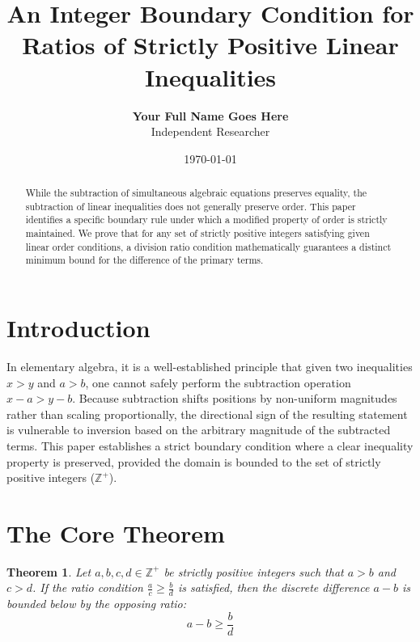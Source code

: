 \documentclass[11pt]{article}
\title{An Integer Boundary Condition for Ratios of Strictly Positive Linear Inequalities}
\author{\textbf{Your Full Name Goes Here} \\ Independent Researcher}
\date{\today}
\newtheorem{theorem}{Theorem}
\begin{document}
\maketitle

\begin{abstract}
While the subtraction of simultaneous algebraic equations preserves equality, the subtraction of linear inequalities does not generally preserve order. This paper identifies a specific boundary rule under which a modified property of order is strictly maintained. We prove that for any set of strictly positive integers satisfying given linear order conditions, a division ratio condition mathematically guarantees a distinct minimum bound for the difference of the primary terms.
\end{abstract}

\section{Introduction}
In elementary algebra, it is a well-established principle that given two inequalities $x > y$ and $a > b$, one cannot safely perform the subtraction operation $x - a > y - b$. Because subtraction shifts positions by non-uniform magnitudes rather than scaling proportionally, the directional sign of the resulting statement is vulnerable to inversion based on the arbitrary magnitude of the subtracted terms. This paper establishes a strict boundary condition where a clear inequality property is preserved, provided the domain is bounded to the set of strictly positive integers ($\mathbb{Z}^+$).

\section{The Core Theorem}
\begin{theorem}
Let $a, b, c, d \in \mathbb{Z}^+$ be strictly positive integers such that $a > b$ and $c > d$. If the ratio condition $\frac{a}{c} \ge \frac{b}{d}$ is satisfied, then the discrete difference $a - b$ is bounded below by the opposing ratio:
\begin{equation}
a - b \ge \frac{b}{d}
\end{equation}
\end{theorem}
\end{document}
